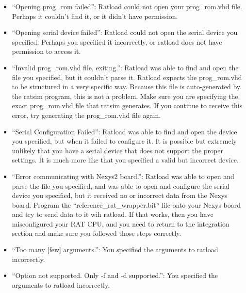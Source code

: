 \documentclass[notitlepage]{article}
\begin{document}
\begin{itemize}
\item ``Opening prog\_rom failed'': Ratload could not open your prog\_rom.vhd file. Perhaps it couldn't find it, or it didn't have permission.
\item ``Opening serial device failed'': Ratload could not open the serial device you specified. Perhaps you specified it incorrectly, or ratload does not have permission to access it.
\item ``Invalid prog\_rom.vhd file, exiting.'': Ratload was able to find and open the file you specified, but it couldn't parse it. Ratload expects the prog\_rom.vhd to be structured in a very specific way. Because this file is auto-generated by the ratsim program, this is not a problem. Make sure you are specifying the exact prog\_rom.vhd file that ratsim generates. If you continue to receive this error, try generating the prog\_rom.vhd file again.
\item ``Serial Configuration Failed'': Ratload was able to find and open the device you specified, but when it failed to configure it. It is possible but extremely unlikely that you have a serial device that does not support the proper settings. It is much more like that you specified a valid but incorrect device.
\item ``Error communicating with Nexys2 board.'': Ratload was able to open and parse the file you specified, and was able to open and configure the serial device you specified, but it received no or incorrect data from the Nexys board. Program the ``reference\_rat\_wrapper.bit'' file onto your Nexys board and try to send data to it wih ratload. If that works, then you have misconfigured your RAT CPU, and you need to return to the integration section and make sure you followed those steps correctly. 
\item ``Too many [few] arguments.'': You specified the arguments to ratload incorrectly.
\item ``Option not supported. Only -f and -d supported.'': You specified the arguments to ratload incorrectly.
\end{itemize}
\end{document}
